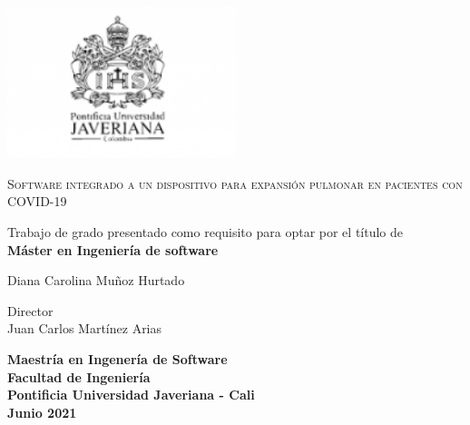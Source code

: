 \begin{titlepage}
	\centering
	\includegraphics[width=0.5\textwidth]{logo}\par\vspace{1cm}
	{\scshape\large Software integrado a un dispositivo para expansi\'on pulmonar en pacientes con COVID-19 \par}
	\vspace{2cm}
	{ Trabajo de grado presentado como requisito para optar por el título de \\
    \textbf{Máster en Ingeniería de software}\par}
	\vspace{1.5cm}
	
	{ Diana Carolina Mu\~noz Hurtado\par}
	\vspace{0.2cm}
	Director\\
	Juan Carlos Mart\'inez Arias

	\vspace{2cm}
    
    {\bfseries Maestría en Ingener\'ia de Software \\
    Facultad de Ingenier\'ia\\
    Pontificia Universidad Javeriana - Cali\\
    \vspace{1.2cm}
    Junio 2021\par}
    
\end{titlepage}